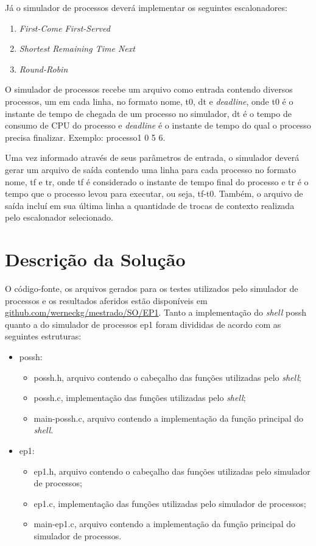 \documentclass[12pt]{article}
\begin{document}
Já o simulador de processos deverá implementar os seguintes escalonadores:
\begin{enumerate}
	\item \textit{First-Come First-Served}
	\item \textit{Shortest Remaining Time Next}
	\item \textit{Round-Robin}
\end{enumerate}

O simulador de processos recebe um arquivo como entrada contendo diversos processos, um em cada linha, no formato nome, t0, dt e \textit{deadline}, onde t0 é o instante de tempo de chegada de um processo no simulador, dt é o tempo de consumo de CPU do processo e \textit{deadline} é o instante de tempo do qual o processo precisa finalizar. Exemplo: processo1 0 5 6.

Uma vez informado através de seus parâmetros de entrada, o simulador deverá gerar um arquivo de saída contendo uma linha para cada processo no formato nome, tf e tr, onde tf é considerado o instante de tempo final do processo e tr é o tempo que o processo levou para executar, ou seja, tf-t0. Também, o arquivo de saída incluí em sua última linha a quantidade de trocas de contexto realizada pelo escalonador selecionado.

\section{Descrição da Solução}

O código-fonte, os arquivos gerados para os testes utilizados pelo simulador de processos e os resultados aferidos estão disponíveis em \url{github.com/werneckg/mestrado/SO/EP1}. Tanto a implementação do \textit{shell} possh quanto a do simulador de processos ep1 foram divididas de acordo com as seguintes estruturas:
\begin{itemize}
	\item possh:
	\begin{itemize}
		\item possh.h, arquivo contendo o cabeçalho das funções utilizadas pelo \textit{shell};
		\item possh.c, implementação das funções utilizadas pelo \textit{shell};
		\item main-possh.c, arquivo contendo a implementação da função principal do \textit{shell}.
	\end{itemize}
	\item ep1:
	\begin{itemize}
		\item ep1.h, arquivo contendo o cabeçalho das funções utilizadas pelo simulador de processos;
		\item ep1.c, implementação das funções utilizadas pelo simulador de processos;
		\item main-ep1.c, arquivo contendo a implementação da função principal do simulador de processos.
	\end{itemize}

\end{itemize}
\end{document}
